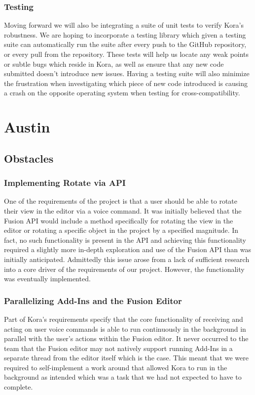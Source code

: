 \documentclass[onecolumn, draftclsnofoot,10pt, compsoc]{IEEEtran}
\begin{document}
		\subsubsection{Testing}
			Moving forward we will also be integrating a suite of unit tests to verify Kora's robustness.
			We are hoping to incorporate a testing library which given a testing suite can automatically run the suite after every push to the GitHub repository, or every pull from the repository.
			These tests will help us locate any weak points or subtle bugs which reside in Kora, as well as ensure that any new code submitted doesn't introduce new issues.
			Having a testing suite will also minimize the frustration when investigating which piece of new code introduced is causing a crash on the opposite operating system when testing for cross-compatibility.
			
		
	
	
	
	
	
	
\section{Austin}
    \subsection{Obstacles}
	    \subsubsection{Implementing Rotate via API}
		    One of the requirements of the project is that a user should be able to rotate their view in the editor via a voice command.
		    It was initially believed that the Fusion API would include a method specifically for rotating the view in the editor or rotating a specific object in the project by a specified magnitude.
		    In fact, no such functionality is present in the API and achieving this functionality required a slightly more in-depth exploration and use of the Fusion API than was initially anticipated.
		    Admittedly this issue arose from a lack of sufficient research into a core driver of the requirements of our project.
		    However, the functionality was eventually implemented.


   	 \subsubsection{Parallelizing Add-Ins and the Fusion Editor}
		    Part of Kora’s requirements specify that the core functionality of receiving and acting on user voice commands is able to run continuously in the background in parallel with the user’s actions within the Fusion editor.
		    It never occurred to the team that the Fusion editor may not natively support running Add-Ins in a separate thread from the editor itself which is the case.
		    This meant that we were required to self-implement a work around that allowed Kora to run in the background as intended which was a task that we had not expected to have to complete.
\end{document}
